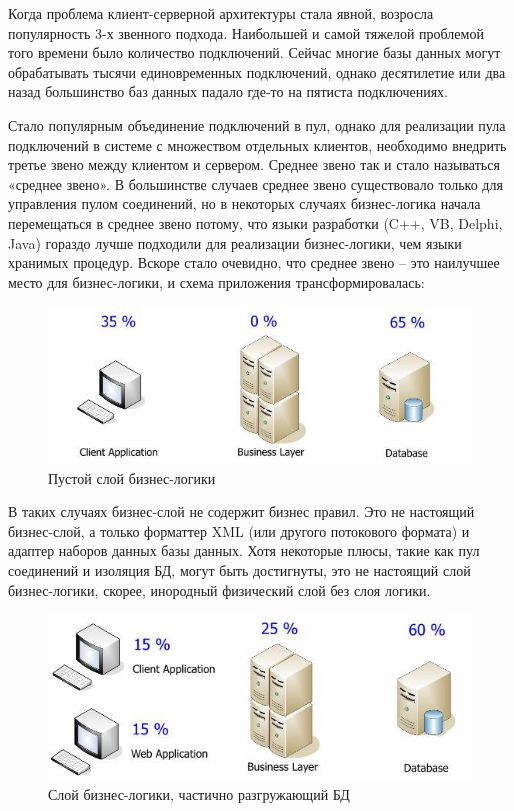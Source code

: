 \documentclass[14pt, a4paper]{extreport}
\begin{document}
Когда проблема клиент-серверной архитектуры стала явной, возросла популярность 3-х звенного подхода. Наибольшей и самой тяжелой проблемой того времени было количество подключений. Сейчас многие базы данных могут обрабатывать тысячи единовременных подключений, однако десятилетие или два назад большинство баз данных падало где-то на пятиста подключениях.

Стало популярным объединение подключений в пул, однако для реализации пула подключений в системе с множеством отдельных клиентов, необходимо внедрить третье звено между клиентом и сервером. Среднее звено так и стало называться «среднее звено». В большинстве случаев среднее звено существовало только для управления пулом соединений, но в некоторых случаях бизнес-логика начала перемещаться в среднее звено потому, что языки разработки (C++, VB, Delphi, Java) гораздо лучше подходили для реализации бизнес-логики, чем языки хранимых процедур. Вскоре стало очевидно, что среднее звено -- это наилучшее место для бизнес-логики, и схема приложения трансформировалась:

\begin{figure}[!htb]
  \centering
    \includegraphics[scale=0.6]{../shared_images/business-logic/client-server-business.jpg}
   \caption{Пустой слой бизнес-логики}
    \label{fig:start}
\end{figure}

В таких случаях бизнес-слой не содержит бизнес правил. Это не настоящий бизнес-слой, а только форматтер XML (или другого потокового формата) и адаптер наборов данных базы данных. Хотя некоторые плюсы, такие как пул соединений и изоляция БД, могут быть достигнуты, это не настоящий слой бизнес-логики, скорее, инородный физический слой без слоя логики.

\begin{figure}[!htb]
  \centering
    \includegraphics[scale=0.6]{../shared_images/business-logic/client-server-business-2.jpg}
   \caption{Слой бизнес-логики, частично разгружающий БД}
    \label{fig:start}
\end{figure}
\end{document}
